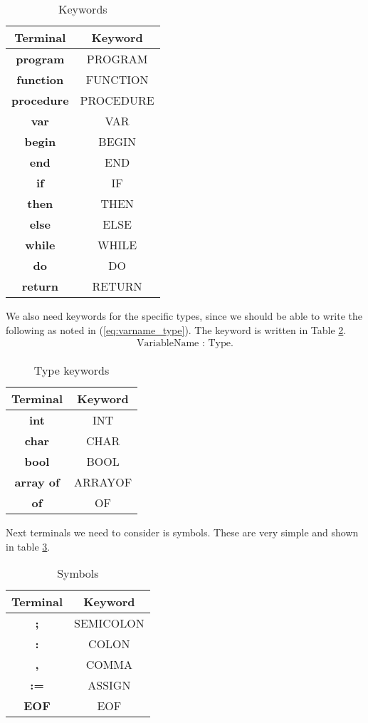 \documentclass[10pt]{article}
\begin{document}
\begin{table}[h!]
\centering
\begin{tabular}{c|c}
Terminal & Keyword \\
\hline
\textbf{program} & PROGRAM \\
\textbf{function} & FUNCTION \\
\textbf{procedure} & PROCEDURE \\
\textbf{var} & VAR \\
\textbf{begin} & BEGIN \\
\textbf{end} & END \\
\textbf{if} & IF \\
\textbf{then} & THEN \\
\textbf{else} & ELSE \\
\textbf{while} & WHILE \\
\textbf{do} & DO \\
\textbf{return} & RETURN \\
\end{tabular}
\caption{\label{tab:keywords}Keywords}
\end{table}

We also need keywords for the specific types, since we should be able to write the following as noted in (\ref{eq:varname_type}). The keyword is written in Table \ref{tab:type_keywords}.
\begin{align}
\label{eq:varname_type}
\text{VariableName} \textbf{ : } \text{Type}. %
\end{align}

\begin{table}[h!]
\centering
\begin{tabular}{c|c}
Terminal & Keyword \\
\hline
\textbf{int} & INT \\
\textbf{char} & CHAR \\
\textbf{bool} & BOOL \\
\textbf{array of} & ARRAYOF \\
\textbf{of} & OF \\
\end{tabular}
\caption{\label{tab:type_keywords}Type keywords}
\end{table}

Next terminals we need to consider is symbols. These are very simple and shown in table \ref{tab:symbols}.

\begin{table}[h!]
\centering
\begin{tabular}{c|c}
Terminal & Keyword \\
\hline
\textbf{;} & SEMICOLON \\
\textbf{:} & COLON \\
\textbf{,} & COMMA \\
\textbf{:=} & ASSIGN \\
\textbf{EOF} & EOF \\
\end{tabular}
\caption{\label{tab:symbols}Symbols}
\end{table}
\end{document}

